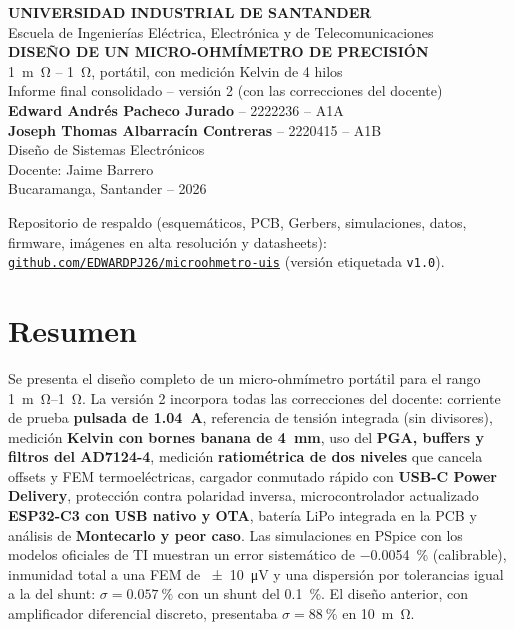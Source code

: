 \documentclass[11pt,a4paper]{article}
\newcommand{\repo}{https://github.com/EDWARDPJ26/microohmetro-uis}
\begin{document}
\begin{titlepage}
\centering
\vspace*{8mm}
{\Large\textbf{UNIVERSIDAD INDUSTRIAL DE SANTANDER}}\\[2mm]
{\large Escuela de Ingenierías Eléctrica, Electrónica y de Telecomunicaciones}\\[14mm]
{\LARGE\textbf{DISEÑO DE UN MICRO-OHMÍMETRO DE PRECISIÓN}}\\[3mm]
{\Large \SI{1}{m\ohm} -- \SI{1}{\ohm}, portátil, con medición Kelvin de 4 hilos}\\[3mm]
{\large Informe final consolidado -- versión 2 (con las correcciones del docente)}\\[16mm]
\textbf{Edward Andrés Pacheco Jurado} -- 2222236 -- A1A\\[2mm]
\textbf{Joseph Thomas Albarracín Contreras} -- 2220415 -- A1B\\[14mm]
Diseño de Sistemas Electrónicos\\ Docente: Jaime Barrero\\[18mm]
Bucaramanga, Santander -- 2026\\[10mm]
\begin{minipage}{0.86\textwidth}\small
Repositorio de respaldo (esquemáticos, PCB, Gerbers, simulaciones, datos, firmware, imágenes en alta resolución y datasheets):
\href{\repo}{\texttt{github.com/EDWARDPJ26/microohmetro-uis}} (versión etiquetada \texttt{v1.0}).
\end{minipage}
\end{titlepage}

\tableofcontents\clearpage
\listoffigures\listoftables\clearpage
{}

\section*{Resumen}
Se presenta el diseño completo de un micro-ohmímetro portátil para el rango \SI{1}{m\ohm}--\SI{1}{\ohm}. La versión 2 incorpora todas las correcciones del docente: corriente de prueba \textbf{pulsada de \SI{1,04}{A}}, referencia de tensión integrada (sin divisores), medición \textbf{Kelvin con bornes banana de \SI{4}{mm}}, uso del \textbf{PGA, buffers y filtros del AD7124-4}, medición \textbf{ratiométrica de dos niveles} que cancela offsets y FEM termoeléctricas, cargador conmutado rápido con \textbf{USB-C Power Delivery}, protección contra polaridad inversa, microcontrolador actualizado \textbf{ESP32-C3 con USB nativo y OTA}, batería LiPo integrada en la PCB y análisis de \textbf{Montecarlo y peor caso}. Las simulaciones en PSpice con los modelos oficiales de TI muestran un error sistemático de \SI{-0,0054}{\percent} (calibrable), inmunidad total a una FEM de \SI{\pm10}{\micro V} y una dispersión por tolerancias igual a la del shunt: $\sigma=\SI{0,057}{\percent}$ con un shunt del \SI{0,1}{\percent}. El diseño anterior, con amplificador diferencial discreto, presentaba $\sigma=\SI{88}{\percent}$ en \SI{10}{m\ohm}.
\end{document}
